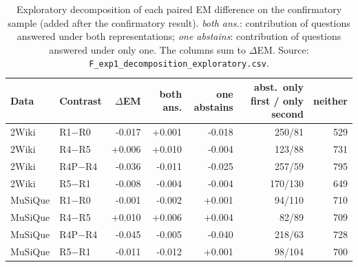 \begin{table}[t]
\centering
\footnotesize
\begin{tabular}{@{}llrrrrr@{}}
\toprule
Data & Contrast & $\Delta$EM & both ans. & one abstains & abst.\ only first / only second & neither \\
\midrule
2Wiki & R1$-$R0 & -0.017 & +0.001 & -0.018 & 250/81 & 529 \\
2Wiki & R4$-$R5 & +0.006 & +0.010 & -0.004 & 123/88 & 731 \\
2Wiki & R4P$-$R4 & -0.036 & -0.011 & -0.025 & 257/59 & 795 \\
2Wiki & R5$-$R1 & -0.008 & -0.004 & -0.004 & 170/130 & 649 \\
MuSiQue & R1$-$R0 & -0.001 & -0.002 & +0.001 & 94/110 & 710 \\
MuSiQue & R4$-$R5 & +0.010 & +0.006 & +0.004 & 82/89 & 709 \\
MuSiQue & R4P$-$R4 & -0.045 & -0.005 & -0.040 & 218/63 & 728 \\
MuSiQue & R5$-$R1 & -0.011 & -0.012 & +0.001 & 98/104 & 700 \\
\bottomrule
\end{tabular}
\caption{Exploratory decomposition of each paired EM difference on the confirmatory sample (added after the confirmatory result). \emph{both ans.}: contribution of questions answered under both representations; \emph{one abstains}: contribution of questions answered under only one. The columns sum to $\Delta$EM. Source: \texttt{F\_exp1\_decomposition\_exploratory.csv}.}
\label{tab:decomposition}
\end{table}
